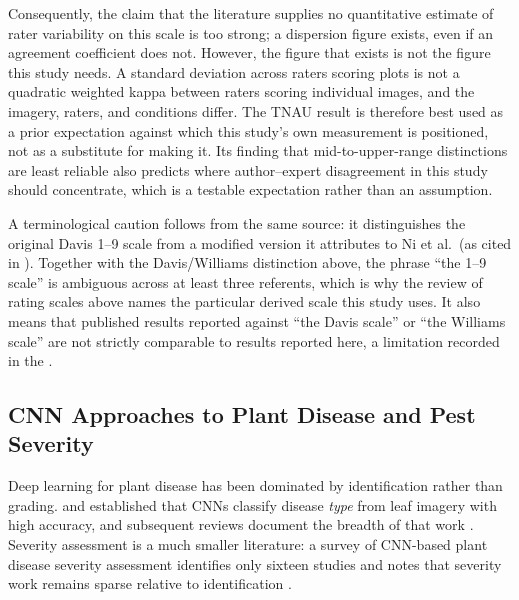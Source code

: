 \documentclass{icsthesis}
\newcommand{\secref}[1]{\textit{\nameref{#1}}}
\begin{document}
\begin{mainmatter}
				Consequently, the claim that the literature supplies no quantitative estimate of
				rater variability on this scale is too strong; a dispersion figure exists, even if
				an agreement coefficient does not. However, the figure that exists is not the figure
				this study needs. A standard deviation across raters scoring plots is not a
				quadratic weighted kappa between raters scoring individual images, and the imagery,
				raters, and conditions differ. The TNAU result is therefore best used as a prior
				expectation against which this study's own measurement is positioned, not as a
				substitute for making it. Its finding that mid-to-upper-range distinctions are least
				reliable also predicts where author--expert disagreement in this study should
				concentrate, which is a testable expectation rather than an assumption.

				A terminological caution follows from the same source: it distinguishes the original
				Davis 1--9 scale from a modified version it attributes to Ni et al.\ (as cited in
				\citealp{srinivasan2022}). Together with the Davis/Williams distinction above, the
				phrase ``the 1--9 scale'' is ambiguous across at least three referents, which is why
				the review of rating scales above names the particular derived scale this study
				uses. It also means that published results reported against ``the Davis scale'' or
				``the Williams scale'' are not strictly comparable to results reported here, a
				limitation recorded in the \secref{sec:scope}.

			\subsection{CNN Approaches to Plant Disease and Pest Severity}\label{sec:cnnsev}

				Deep learning for plant disease has been dominated by identification rather than
				grading. \citet{mohanty2016} and \citet{ferentinos2018} established that CNNs
				classify disease \textit{type} from leaf imagery with high accuracy, and subsequent
				reviews document the breadth of that work \citep{lu2021,boulent2019}. Severity
				assessment is a much smaller literature: a survey of CNN-based plant disease
				severity assessment identifies only sixteen studies and notes that severity work
				remains sparse relative to identification \citep{shi2023severity}.


\end{mainmatter}
\end{document}
